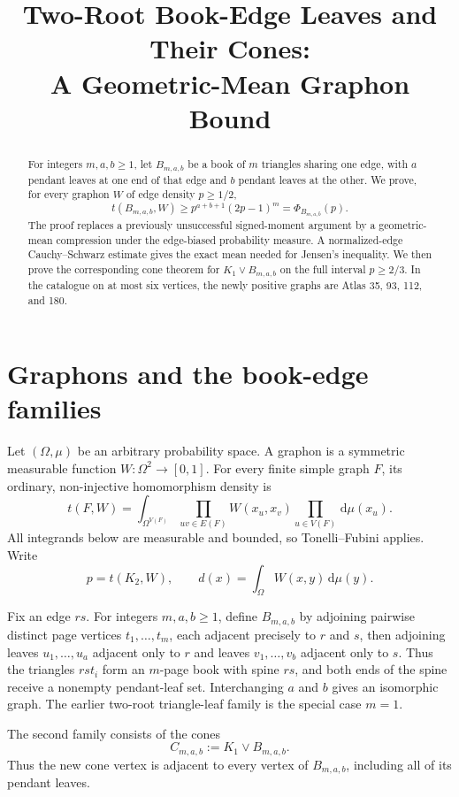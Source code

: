 \documentclass[11pt]{article}
\title{Two-Root Book-Edge Leaves and Their Cones:\\
A Geometric-Mean Graphon Bound}
\author{}
\date{}
\newcommand{\dd}{\,\mathrm{d}}
\newcommand{\join}{\mathbin{\vee}}
\begin{document}
\maketitle

\begin{abstract}
For integers $m,a,b\geq1$, let $B_{m,a,b}$ be a book of $m$ triangles
sharing one edge, with $a$ pendant leaves at one end of that edge and $b$
pendant leaves at the other.  We prove, for every graphon $W$ of edge
density $p\geq1/2$,
\[
 t(B_{m,a,b},W)
 \geq p^{a+b+1}(2p-1)^m
 =\Phi_{B_{m,a,b}}(p).
\]
The proof replaces a previously unsuccessful signed-moment argument by a
geometric-mean compression under the edge-biased probability measure.  A
normalized-edge Cauchy--Schwarz estimate gives the exact mean needed for
Jensen's inequality.  We then prove the corresponding cone theorem for
$K_1\join B_{m,a,b}$ on the full interval $p\geq2/3$.  In the catalogue on
at most six vertices, the newly positive graphs are Atlas 35, 93, 112, and
180.
\end{abstract}


\section{Graphons and the book-edge families}

Let $(\Omega,\mu)$ be an arbitrary probability space.  A graphon is a
symmetric measurable function $W\colon\Omega^2\to[0,1]$.  For every finite
simple graph $F$, its ordinary, non-injective homomorphism density is
\[
 t(F,W)
 =
 \int_{\Omega^{V(F)}}
 \prod_{uv\in E(F)}W(x_u,x_v)
 \prod_{u\in V(F)}\dd\mu(x_u).
\]
All integrands below are measurable and bounded, so Tonelli--Fubini applies.
Write
\[
 p=t(K_2,W),
 \qquad
 d(x)=\int_\Omega W(x,y)\dd\mu(y).
\]

Fix an edge $rs$.  For integers $m,a,b\geq1$, define $B_{m,a,b}$ by
adjoining pairwise distinct page vertices $t_1,\ldots,t_m$, each adjacent
precisely to $r$ and $s$, then adjoining leaves $u_1,\ldots,u_a$ adjacent
only to $r$ and leaves $v_1,\ldots,v_b$ adjacent only to $s$.  Thus the
triangles $rst_i$ form an $m$-page book with spine $rs$, and both ends of
the spine receive a nonempty pendant-leaf set.  Interchanging $a$ and $b$
gives an isomorphic graph.  The earlier two-root triangle-leaf family is
the special case $m=1$.

The second family consists of the cones
\[
 C_{m,a,b}:=K_1\join B_{m,a,b}.
\]
Thus the new cone vertex is adjacent to every vertex of $B_{m,a,b}$, including
all of its pendant leaves.
\end{document}
